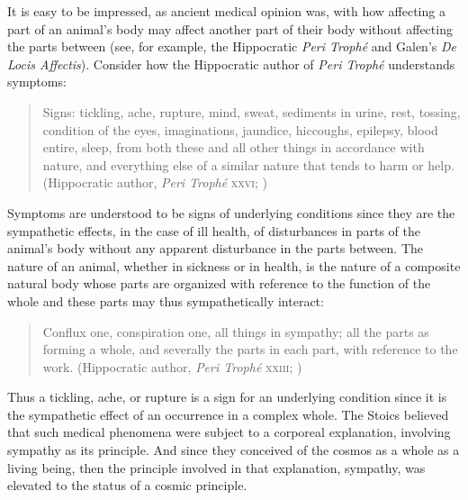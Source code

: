 It is easy to be impressed, as ancient medical opinion was, with how affecting a part of an animal's body may affect another part of their body without affecting the parts between (see, for example, the Hippocratic \emph{Peri Troph\'{e}} and Galen's \emph{De Locis Affectis}). Consider how the Hippocratic author of \emph{Peri Troph\'{e}} understands symptoms: 
\begin{quote}
	Signs: tickling, ache, rupture, mind, sweat, sediments in urine, rest, tossing, condition of the eyes, imaginations, jaundice, hiccoughs, epilepsy, blood entire, sleep, from both these and all other things in accordance with nature, and everything else of a similar nature that tends to harm or help. (Hippocratic author, \emph{Peri Troph\'{e}} \textsc{xxvi}; \citealt[351]{Jones:1957aa})
\end{quote}
Symptoms are understood to be signs of underlying conditions since they are the sympathetic effects, in the case of ill health, of disturbances in parts of the animal's body without any apparent disturbance in the parts between. The nature of an animal, whether in sickness or in health, is the nature of a composite natural body whose parts are organized with reference to the function of the whole and these parts may thus sympathetically interact:
\begin{quote}
	Conflux one, conspiration one, all things in sympathy; all the parts as forming a whole, and severally the parts in each part, with reference to the work. (Hippocratic author, \emph{Peri Troph\'{e}} \textsc{xxiii}; \citealt[351]{Jones:1957aa})
\end{quote}
Thus a tickling, ache, or rupture is a sign for an underlying condition since it is the sympathetic effect of an occurrence in a complex whole. The Stoics believed that such medical phenomena were subject to a corporeal explanation, involving sympathy as its principle. And since they conceived of the cosmos as a whole as a living being, then the principle involved in that explanation, sympathy, was elevated to the status of a cosmic principle.


